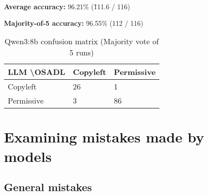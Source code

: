 \textbf{Average accuracy:} 96.21\% (\~ 111.6 / 116)

\textbf{Majority-of-5 accuracy:} 96.55\% (112 / 116)

\begin{table}[h]
	\caption{Qwen3:8b confusion matrix (Majority vote of 5 runs)}
	\label{tab:qwen3-confmatrix}
	\centering
	\begin{tabular}{l|ll}
		\hline
		\textbf{LLM \textbackslash OSADL} & Copyleft & Permissive \\ \hline
		Copyleft & 26 & 1 \\
		Permissive & 3 & 86 \\\hline
	\end{tabular}
\end{table}

\section{Examining mistakes made by models}

\subsection{General mistakes}

